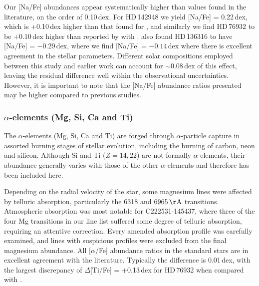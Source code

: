 \documentclass{emulateapj}
\begin{document}
Our [Na/Fe] abundances appear systematically higher than values found in the literature, on the order of 0.10\,dex. For HD\,142948 we yield {[Na/Fe] = 0.22}\,dex, which is +0.10\,dex higher than that found for \citet{gratton;et-al_2000}, and similarly we find HD\,76932 to be +0.10\,dex higher than reported by with \citet{fulbright_2000}. \citet{gratton;et-al_2000} also found HD\,136316 to have {[Na/Fe] = $-$0.29}\,dex, where we find {[Na/Fe] = $-0.14$}\,dex where there is excellent agreement in the stellar parameters. Different solar compositions employed between this study and earlier work can account for $\sim$0.08\,dex of this effect, leaving the residual difference well within the observational uncertainties. However, it is important to note that the [Na/Fe] abundance ratios presented may be higher compared to previous studies.

\subsubsection{$\alpha$-elements (Mg, Si, Ca and Ti)}
\label{sec:alpha-elements}

The $\alpha$-elements (Mg, Si, Ca and Ti) are forged through $\alpha$-particle capture in assorted burning stages of stellar evolution, including the burning of carbon, neon and silicon. Although Si and Ti ($Z = 14, 22$) are not formally $\alpha$-elements, their abundance generally varies with those of the other $\alpha$-elements and therefore has been included here.

Depending on the radial velocity of the star, some magnesium lines were affected by telluric absorption, particularly the 6318 and $6965\,{\rm \AA}$ transitions. Atmospheric absorption was most notable for C222531-145437, where three of the four Mg transitions in our line list suffered some degree of telluric absorption, requiring an attentive correction. Every amended absorption profile was carefully examined, and lines with suspicious profiles were excluded from the final magnesium abundance. All [$\alpha$/Fe] abundance ratios in the standard stars are in excellent agreement with the literature. Typically the difference is 0.01\,dex, with the largest discrepancy of {$\Delta$[Ti/Fe] = +0.13\,dex} for HD\,76932 when compared with \citet{fulbright_2000}.
\end{document}
